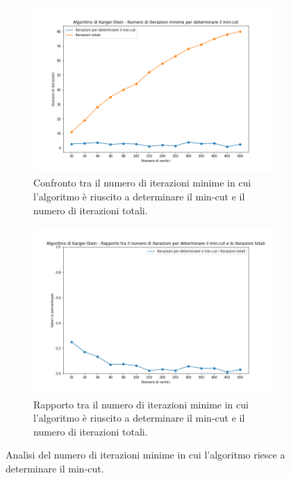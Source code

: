\begin{figure}[H]
	\begin{subfigure}{.5\textwidth}
		\centering
		\includegraphics[width=1\textwidth]{res/images/single/karger-stein/iterazioni/karger_stein_confronto_numero_iterazioni.png}
		\caption{Confronto tra il numero di iterazioni minime in cui l'algoritmo è 
		riuscito a determinare il min-cut e il numero di iterazioni totali.}
		\label{fig:karger_stein_confronto_numero_iterazioni}
	\end{subfigure}
	\begin{subfigure}{.5\textwidth}
		\centering
		\includegraphics[width=1\textwidth]{res/images/single/karger-stein/iterazioni/karger_stein_rapporto_numero_iterazioni.png}
		\caption{Rapporto tra il numero di iterazioni minime in cui l'algoritmo è 
		riuscito a determinare il min-cut e il numero di iterazioni totali.}
		\label{fig:karger_stein_rapporto_numero_iterazioni}
	\end{subfigure}
	\caption{Analisi del numero di iterazioni minime in cui l'algoritmo riesce a 
	determinare il min-cut.}
	\label{fig:karger_stein_numero_iterazioni}
\end{figure}

